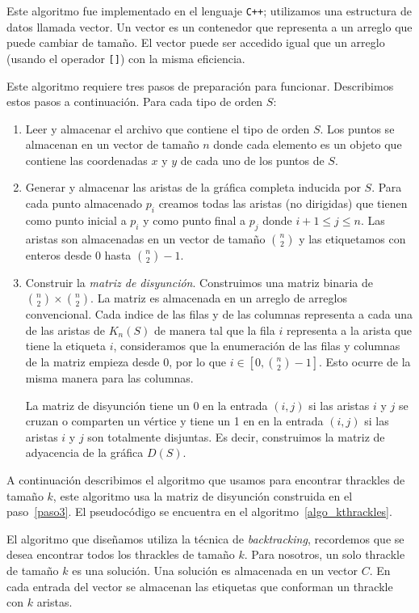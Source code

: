   Este algoritmo fue implementado en el lenguaje \texttt{C++}; utilizamos una
  estructura de datos llamada vector. Un vector es un contenedor que representa
  a un arreglo que puede cambiar de tamaño. El vector puede ser accedido igual
  que un arreglo (usando el operador \texttt{[]}) con la misma eficiencia.

  Este algoritmo requiere tres pasos de preparación para funcionar. Describimos estos pasos a continuación. Para cada tipo de orden $S$:
  \begin{enumerate}
    \item Leer y almacenar el archivo que contiene el tipo de orden $S$.
    Los puntos se almacenan en un vector de tamaño $n$ donde cada elemento es
    un objeto que contiene las coordenadas $x$ y $y$ de cada uno de los puntos
    de $S$.
    \item Generar y almacenar las aristas de la gráfica completa inducida por
    $S$. Para cada punto almacenado $p_i$ creamos todas las aristas (no
    dirigidas) que tienen como punto inicial a $p_i$ y como punto final a $p_j$
    donde $ i+1 \leq j \leq n$.
    Las aristas son almacenadas en un vector de tamaño $\binom{n}{2}$ y las
    etiquetamos con enteros desde $0$ hasta $\binom{n}{2}-1$.
    \item \label{paso3}Construir la \emph{matriz de disyunción}.
    Construimos una matriz binaria de $\binom{n}{2}\times \binom{n}{2}$. La
    matriz es almacenada en un arreglo de arreglos convencional. Cada
    indice de las filas y de las columnas representa a cada una de las aristas
    de $K_n(S)$ de manera tal que la fila $i$ representa a la arista que tiene
    la etiqueta $i$, consideramos que la enumeración de las filas y columnas de
    la matriz empieza desde $0$, por lo que $i \in [0,\binom{n}{2}-1]$. Esto ocurre de la misma manera para las columnas.

    La matriz de disyunción tiene un 0 en la entrada $(i,j)$ si las aristas $i$ y $j$ se cruzan o comparten un vértice y tiene un 1 en en la entrada $(i,j)$ si las aristas $i$ y $j$ son totalmente disjuntas. Es decir, construimos la
    matriz de adyacencia de la gráfica $D(S)$.
  \end{enumerate}

  A continuación describimos el algoritmo que usamos para encontrar thrackles
  de tamaño $k$, este algoritmo usa la matriz de disyunción construida en el
  paso~\ref{paso3}. El pseudocódigo se encuentra en el
  algoritmo~\ref{algo_kthrackles}.

  El algoritmo que diseñamos utiliza la técnica de \emph{backtracking},
  recordemos que se desea encontrar todos los thrackles de tamaño $k$. Para
  nosotros, un solo thrackle de tamaño $k$ es una solución. Una solución es
  almacenada en un vector $C$. En cada entrada del vector se almacenan las etiquetas que conforman un thrackle con $k$ aristas.

